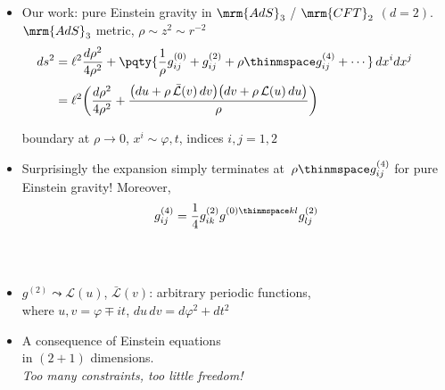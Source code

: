 \documentclass[11pt]{article}
\begin{document}
\begin{multicols}{3}
\begin{itemize}
\begin{itemize}
\end{itemize}

\item Our work: pure Einstein gravity in $\mrm{AdS}_3$ / $\mrm{CFT}_2$ $(d=2)$.\\
$\mrm{AdS}_3$ metric, $\rho \sim z^2 \sim r^{-2}$
\begin{equation}
\hspace{-2em}
\begin{aligned}
	ds^2
	&= \ell^2 \frac{d\rho^2}{4 \rho^2} + \pqty{\frac{1}{\rho} g^{(0)}_{ij} + g^{(2)}_{ij} + \rho\thinmspace g^{(4)}_{ij} + \cdots}\, dx^i dx^j
\\[.5ex]
	&= \ell^2 \bigg( \frac{d\rho^2}{4 \rho^2} + \frac{ \big( du + \rho \, \mathcal {\bar L}(v)\, dv \big) \big( dv + \rho \, \mathcal L(u)\, du \big) }{\rho} \bigg)
	\label{fggauge}
\end{aligned}
\end{equation}

\vspace{-.5\baselineskip}
boundary at $\rho \to 0$, $x^{i} \sim \varphi, t$, indices $i,j = 1,2$


\item Surprisingly the expansion simply terminates at~$\rho\thinmspace g^{(4)}_{ij}$ for pure Einstein gravity! Moreover,
\begin{equation}
	g^{(4)}_{ij} = \frac{1}{4} g^{(2)}_{ik} g^{(0)\thinmspace kl}_{\phantom{kl}} g^{(2)}_{lj}
\end{equation}
\textcite{Fefferman:2007rka}\\
\textcite{Banados:1992wn}\\
\textcite{Banados:1998gg}
\end{itemize}

\newcommand{\eqBanados}{
	\begin{equation*}
	\hspace{-2em}
		ds^2 \ \,
	\end{equation*}
}


\begin{itemize}
\item $g^{(2)} \leadsto \mathcal L(u)$, $\bar{\mathcal L}(v)$: arbitrary periodic functions,\\
where $u,v = \varphi \mp it$, $du\,dv = d\varphi^2 + dt^2$


\item A consequence of Einstein equations \\
in $(2+1)$ dimensions.\\
\textit{Too many constraints, too little freedom!}
\end{itemize}


\end{multicols}
\end{document}
